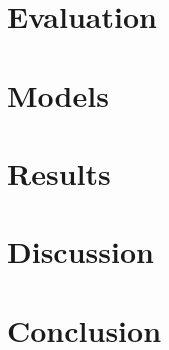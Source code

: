 \documentclass[sigplan,screen]{acmart}
\begin{document}
\section{Evaluation}


\section{Models}


\section{Results}


\section{Discussion}

\section{Conclusion}

\printbibliography
\end{document}
